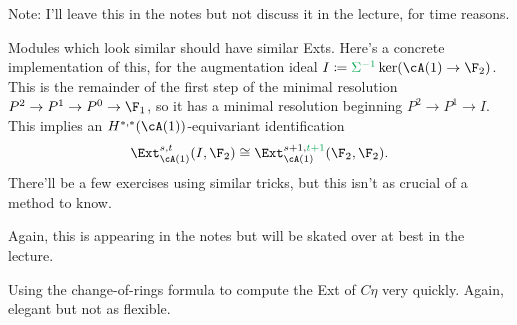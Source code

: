 Note: I'll leave this in the notes but not discuss it in the lecture, for time reasons.
\begin{exm}
Modules which look similar should have similar Exts. Here's a concrete implementation of this, for the augmentation
ideal $I\coloneqq \textcolor{Green}{\Sigma^{-1}}\ker(\cA(1)\to\F_2)$. This is the remainder of the first step of
the minimal resolution $P^2\to P^1\to P^0\to\F_1$, so it has a minimal resolution beginning $P^2\to P^1\to I$. This
implies an $H^{*,*}(\cA(1))$-equivariant identification
\begin{equation}
	\Ext_{\cA(1)}^{s, t}(I, \F_2) \cong\Ext_{\cA(1)}^{s+1, \textcolor{Green}{t+1}}(\F_2, \F_2).
\end{equation}
There'll be a few exercises using similar tricks, but this isn't as crucial of a method to know.
\end{exm}
Again, this is appearing in the notes but will be skated over at best in the lecture.
\begin{exm}
Using the change-of-rings formula to compute the Ext of $C\eta$ very quickly. Again, elegant but not as flexible.
\end{exm}

